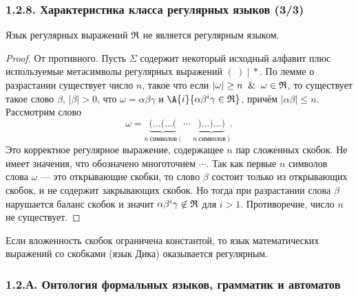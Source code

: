 \begin{frame}
\frametitle{1.2.8. Характеристика класса регулярных языков (3/3) }

\begin{theorem}
Язык регулярных выражений $\frak{R}$ не является регулярным языком.
\end{theorem}
\begin{proof}
От противного.
Пусть $\Sigma$  
содержит некоторый исходный алфавит 
плюс используемые метасимволы регулярных выражений $(~)~|~*$. По лемме о разрастании существует число $n$,
такое что если $|\omega|\ge n \And \omega\in \frak{R}$, то существует
такое слово $\beta$, $|\beta|>0$, что $\omega=\alpha\beta\gamma$
и $\A{i}{\alpha\beta^i\gamma\in\frak{R}}$, причём $|\alpha\beta|\le n$.
Рассмотрим слово
\[
\omega=\underbrace{( \dots ( \dots (}_{n~\text{символов}~(}\ \cdots\ 
\underbrace{)\dots )\dots)}_{n~\text{символов}~)}.
\]
Это корректное регулярное выражение, содержащее $n$ пар сложенных скобок.
Не имеет значения, что обозначено многоточием $\cdots$. 
Так как первые $n$ символов слова $\omega$ --- это открывающие скобки,
то слово $\beta$ состоит только из открывающих скобок, 
и не содержит закрывающих скобок. 
Но тогда при разрастании слова $\beta$ нарушается баланс скобок и значит
  $\alpha\beta^i\gamma\not\in\frak{R}$ для $i>1$.
  Противоречие, число $n$ не существует. 
\end{proof}

\begin{remark}
Если вложенность скобок ограничена константой, то язык математических выражений
со скобками (язык Дика) оказывается регулярным.
\end{remark}

\end{frame}



\begin{frame}
\frametitle{1.2.А. Онтология формальных языков, грамматик и автоматов}
\end{frame}

